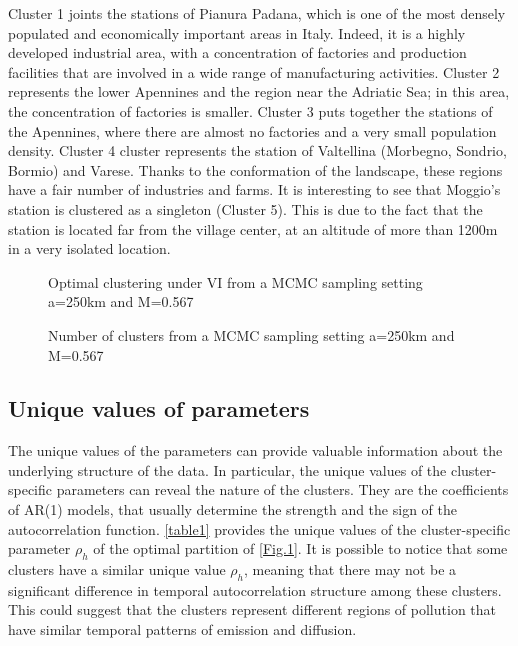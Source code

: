 \documentclass[12pt,a4paper]{article}
\begin{document}
Cluster 1 joints the stations of Pianura Padana, which is one of the most densely populated and economically important areas in Italy. Indeed, it is a highly developed industrial area, with a concentration of factories and production facilities that are involved in a wide range of manufacturing activities. Cluster 2 represents the lower Apennines and the region near the Adriatic Sea; in this area, the concentration of factories is smaller.
Cluster 3 puts together the stations of the Apennines, where there are almost no factories and a very small population density.
Cluster 4 cluster represents the station of Valtellina (Morbegno, Sondrio, Bormio) and Varese. Thanks to the conformation of the landscape, these regions have a fair number of industries and farms.
It is interesting to see that Moggio's station is clustered as a singleton (Cluster 5). This is due to the fact that the station is located far from the village center, at an altitude of more than 1200m in a very isolated location.

\begin{figure}[H]
\centering
 
\caption{Optimal clustering under VI from a MCMC sampling setting a=250km and M=0.567}
\label{ts_output_250}
\end{figure}


\begin{figure}[H]
\centering
 
\caption{Number of clusters from a  MCMC sampling setting a=250km and M=0.567}
\label{n_clust_250}
\end{figure}


\subsection{Unique values of parameters}
The unique values of the parameters can provide valuable information about the underlying structure of the data. In particular, the unique values of the cluster-specific parameters can reveal the nature of the clusters. They are the coefficients of AR(1) models, that usually determine the strength and the sign of the autocorrelation function.
 \autoref{table1} provides the unique values of the cluster-specific parameter $\rho_h$ of the optimal partition of \autoref{Fig.1}.  It is possible to notice that some clusters have a similar unique value $\rho_h$, meaning that there may not be a significant difference in temporal autocorrelation structure among these clusters.  This could suggest that the clusters represent different regions of pollution that have similar temporal patterns of emission and diffusion.
\end{document}
